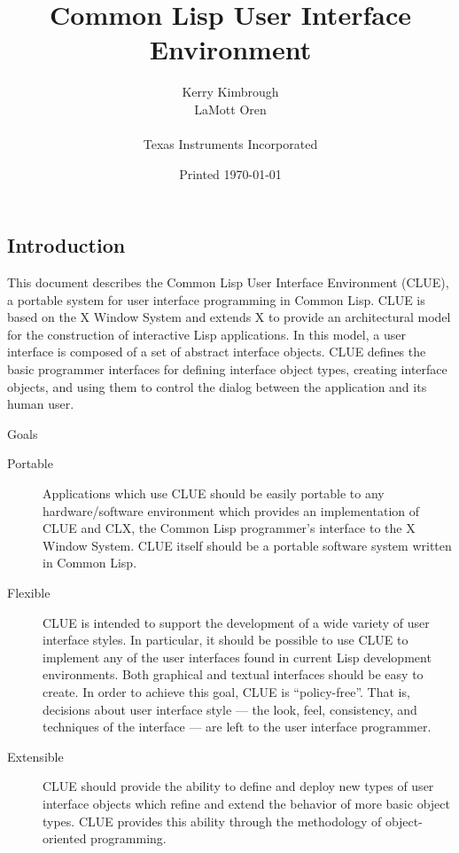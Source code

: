 \documentclass[twoside]{book}
\title{Common Lisp User Interface Environment}
\author{Kerry Kimbrough \\
LaMott Oren \\ \\
Texas Instruments Incorporated}
\date{Version 7.20\\
July, 1990 \\[2 in]
\copyright 1987, 1988, 1989, 1990\  Texas Instruments Incorporated\\[.5in]
\parbox{3.5in}{
     Permission is granted to any individual or institution to use,
     copy, modify and distribute this document, provided that  this
     complete  copyright  and   permission  notice   is maintained,
     intact, in  all  copies  and  supporting documentation. Texas
     Instruments Incorporated  makes  no  representations about the
     suitability of the software described herein for any  purpose.
     It is provided ``as is'' without express or implied warranty.
}}
\date{Printed \today}
\begin{document}
\begin{sloppy}


\maketitle
\setcounter{page}{1}
\tableofcontents
\clearpage
\listoffigures
\clearpage
\setcounter{page}{0}


\chapter {Introduction}
\label {Introduction}

This document describes the Common Lisp User Interface Environment
(CLUE), a portable system for user interface programming in Common
Lisp. CLUE is based on the X Window System \cite{x-window-system} and
extends X to provide an architectural model for the construction of
interactive Lisp applications. In this model, a user interface is
composed of a set of abstract interface objects. CLUE defines the
basic programmer interfaces for defining interface object types,
creating interface objects, and using them to control the dialog
between the application and its human user.

Goals
\begin{description}

\item [Portable]  Applications which use CLUE should be easily portable to any hardware/software
environment which provides an implementation of CLUE and CLX\cite{clx},
the Common Lisp programmer's interface to the X Window System. CLUE
itself should be a portable software system written in Common Lisp\cite{cltl}.


\item [Flexible] CLUE is intended to support the development of a wide
  variety of user interface styles. In particular, it should be
  possible to use CLUE to implement any of the user interfaces found
  in current Lisp development environments. Both graphical and textual
  interfaces should be easy to create. In order to achieve this goal,
  CLUE is ``policy-free''. That is, decisions about user interface
  style --- the look, feel, consistency, and techniques of the
  interface --- are left to the user interface programmer.


\item [Extensible] CLUE should provide the ability to define and
  deploy new types of user interface objects which refine and extend
  the behavior of more basic object types. CLUE provides this ability
  through the methodology of object-oriented programming.


\end{description}
\end{sloppy}
\end{document}
